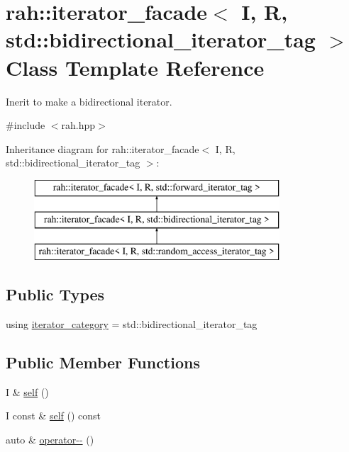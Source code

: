 \hypertarget{structrah_1_1iterator__facade_3_01_i_00_01_r_00_01std_1_1bidirectional__iterator__tag_01_4}{}\section{rah\+::iterator\+\_\+facade$<$ I, R, std\+::bidirectional\+\_\+iterator\+\_\+tag $>$ Class Template Reference}
\label{structrah_1_1iterator__facade_3_01_i_00_01_r_00_01std_1_1bidirectional__iterator__tag_01_4}


Inerit to make a bidirectional iterator.  




{\ttfamily \#include $<$rah.\+hpp$>$}

Inheritance diagram for rah\+::iterator\+\_\+facade$<$ I, R, std\+::bidirectional\+\_\+iterator\+\_\+tag $>$\+:\begin{figure}[H]
\begin{center}
\leavevmode
\includegraphics[height=3.000000cm]{structrah_1_1iterator__facade_3_01_i_00_01_r_00_01std_1_1bidirectional__iterator__tag_01_4}
\end{center}
\end{figure}
\subsection*{Public Types}
\begin{DoxyCompactItemize}
\item 
using \mbox{\hyperlink{structrah_1_1iterator__facade_3_01_i_00_01_r_00_01std_1_1bidirectional__iterator__tag_01_4_a044a4ae4f097558e10b1d52b892a093a}{iterator\+\_\+category}} = std\+::bidirectional\+\_\+iterator\+\_\+tag
\end{DoxyCompactItemize}
\subsection*{Public Member Functions}
\begin{DoxyCompactItemize}
\item 
I \& \mbox{\hyperlink{structrah_1_1iterator__facade_3_01_i_00_01_r_00_01std_1_1bidirectional__iterator__tag_01_4_ae9bfe3425019c0ffb9156f298cba2980}{self}} ()
\item 
I const  \& \mbox{\hyperlink{structrah_1_1iterator__facade_3_01_i_00_01_r_00_01std_1_1bidirectional__iterator__tag_01_4_ae2156f4940ef87b6852ff7abe52002c9}{self}} () const
\item 
auto \& \mbox{\hyperlink{structrah_1_1iterator__facade_3_01_i_00_01_r_00_01std_1_1bidirectional__iterator__tag_01_4_aa75167b7030dfb55cbf7146b4e9f164f}{operator-\/-\/}} ()
\end{DoxyCompactItemize}


